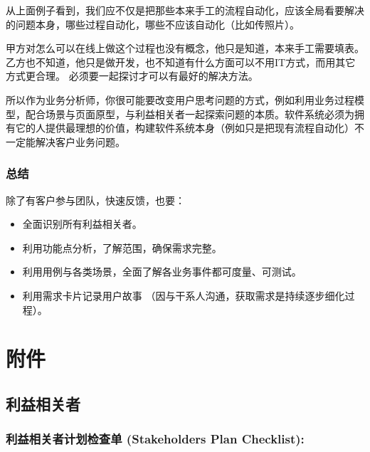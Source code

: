 从上面例子看到，我们应不仅是把那些本来手工的流程自动化，应该全局看要解决的问题本身，哪些过程自动化，哪些不应该自动化（比如传照片）。

甲方对怎么可以在线上做这个过程也没有概念，他只是知道，本来手工需要填表。
乙方也不知道，他只是做开发，也不知道有什么方面可以不用IT方式，而用其它方式更合理。
必须要一起探讨才可以有最好的解决方法。

所以作为业务分析师，你很可能要改变用户思考问题的方式，例如利用业务过程模型，配合场景与页面原型，与利益相关者一起探索问题的本质。软件系统必须为拥有它的人提供最理想的价值，构建软件系统本身（例如只是把现有流程自动化）不一定能解决客户业务问题。

\hypertarget{ux603bux7ed3}{%
\subsubsection{总结}\label{ux603bux7ed3}}

除了有客户参与团队，快速反馈，也要：

\begin{itemize}
\tightlist
\item
  全面识别所有利益相关者。
\item
  利用功能点分析，了解范围，确保需求完整。
\item
  利用用例与各类场景，全面了解各业务事件都可度量、可测试。
\item
  利用需求卡片记录用户故事
  （因与干系人沟通，获取需求是持续逐步细化过程）。
\end{itemize}

\hypertarget{ux9644ux4ef6}{%
\section{附件}\label{ux9644ux4ef6}}

\hypertarget{ux5229ux76caux76f8ux5173ux8005}{%
\subsection{利益相关者}\label{ux5229ux76caux76f8ux5173ux8005}}

\hypertarget{ux5229ux76caux76f8ux5173ux8005ux8ba1ux5212ux68c0ux67e5ux5355-stakeholders-plan-checklist}{%
\subsubsection{利益相关者计划检查单 (Stakeholders Plan
Checklist):}\label{ux5229ux76caux76f8ux5173ux8005ux8ba1ux5212ux68c0ux67e5ux5355-stakeholders-plan-checklist}}

